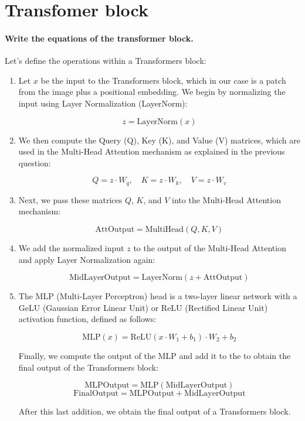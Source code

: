 \section{Transfomer block}

\paragraph{Write the equations of the transformer block.}
Let's define the operations within a Transformers block:

\begin{enumerate}
    \item Let \( x \) be the input to the Transformers block, which in our case is a patch from the image plus a positional embedding. We begin by normalizing the input using Layer Normalization (LayerNorm):

        \[
            z = \text{LayerNorm}(x)
        \]

    \item We then compute the Query (Q), Key (K), and Value (V) matrices, which are used in the Multi-Head Attention mechanism as explained in the previous question:

        \[
            Q = z \cdot W_q, \quad K = z \cdot W_k, \quad V = z \cdot W_v
        \]

    \item Next, we pass these matrices \( Q \), \( K \), and \( V \) into the Multi-Head Attention mechanism:

        \[
            \text{AttOutput} = \text{MultiHead}(Q, K, V)
        \]

    \item We add the normalized input \( z \) to the output of the Multi-Head Attention and apply Layer Normalization again:

        \[
            \text{MidLayerOutput} = \text{LayerNorm}(z + \text{AttOutput})
        \]

    \item The MLP (Multi-Layer Perceptron) head is a two-layer linear network with a GeLU (Gaussian Error Linear Unit) or ReLU (Rectified Linear Unit) activation function, defined as follows:

        \[
            \text{MLP}(x) = \text{ReLU}(x \cdot W_1 + b_1) \cdot W_2 + b_2
        \]

    Finally, we compute the output of the MLP and add it to the  to obtain the final output of the Transformers block:

        \[
            \text{MLPOutput} = \text{MLP}(\text{MidLayerOutput})
        \]
        \[
            \text{FinalOutput} = \text{MLPOutput} + \text{MidLayerOutput}
        \]

    After this last addition, we obtain the final output of a Transformers block.
\end{enumerate}

